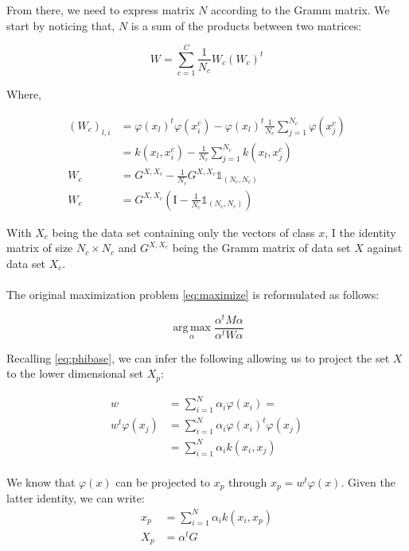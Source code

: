 From there, we need to express matrix $N$ according to the Gramm matrix. We start by noticing that,
$N$ is a sum of the products between two matrices:

\begin{equation*}
W = \sum_{c=1}^C \frac{1}{N_c} W_c (W_c)^t
\end{equation*}

Where,

\begin{align*}
  (W_c)_{l, i} &= \varphi(x_l)^t\varphi(x_i^c) - \varphi(x_l)^t \frac{1}{N_c}\sum_{j=1}^{N_c}\varphi(x_j^c) \\
             &= k(x_l, x_i^c) - \frac{1}{N_c}\sum_{j=1}^{N_c}k(x_l, x_j^c) \\
   W_c       &= G^{X, X_c} - \frac{1}{N_c} G^{X, X_c} \mathds{1}_{(N_c, N_c)} \\
   W_c       &= G^{X, X_c} \left(\textrm{I} - \frac{1}{N_c}\mathds{1}_{(N_c, N_c)}\right)
\end{align*}

With $X_c$ being the data set containing only the vectors of class $x$, $\textrm{I}$ the identity matrix of
size $N_c \times N_c$ and
$G^{X, X_c}$ being the Gramm matrix of data set $X$ against data set $X_c$.

\paragraph{}
The original maximization problem \ref{eq:maximize} is reformulated as follows:

\begin{equation*}
\label{eq:maximize2}
\boxed{\operatorname*{arg\,max}_\alpha \frac{\alpha^t M \alpha}{\alpha^t W \alpha}}
\end{equation*}

Recalling \ref{eq:phibase}, we can infer the following allowing us to project the set $X$ to the
lower dimensional set $X_p$:

\begin{align*}
  w &= \sum_{i=1}^N \alpha_i \varphi(x_i) = \\
  w^t \varphi(x_j) &= \sum_{i = 1}^N \alpha_i \varphi(x_i)^t \varphi(x_j)\\
                   &= \sum_{i = 1}^N \alpha_i k(x_i, x_j) \\
\end{align*}

We know that $\varphi(x)$ can be projected to $x_p$ through $x_p = w^t \varphi(x)$. Given the
latter identity, we can write:
\begin{align*}
x_p &= \sum_{i = 1}^N \alpha_i k(x_i, x_p) \\
X_p &= \alpha^t G \\
\end{align*}
